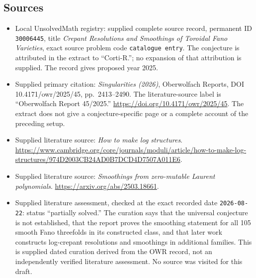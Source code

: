 \documentclass[11pt]{article}
\begin{document}
\subsection{Sources}
\begin{itemize}
\item Local UnsolvedMath registry: supplied complete source record, permanent ID \texttt{30006445}, title \emph{Crepant Resolutions and Smoothings of Toroidal Fano Varieties}, exact source problem code \texttt{catalogue entry}. The conjecture is attributed in the extract to ``Corti-R.''; no expansion of that attribution is supplied. The record gives proposed year 2025.
\item Supplied primary citation: \emph{Singularities (2026)}, Oberwolfach Reports, DOI 10.4171/owr/2025/45, pp.\ 2413--2490. The literature-source label is ``Oberwolfach Report 45/2025.'' \url{https://doi.org/10.4171/owr/2025/45}. The extract does not give a conjecture-specific page or a complete account of the preceding setup.
\item Supplied literature source: \emph{How to make log structures}. \url{https://www.cambridge.org/core/journals/moduli/article/how-to-make-log-structures/974D2003CB24AD0B7DCD4D7507A011E6}.
\item Supplied literature source: \emph{Smoothings from zero-mutable Laurent polynomials}. \url{https://arxiv.org/abs/2503.18661}.
\item Supplied literature assessment, checked at the exact recorded date \texttt{2026-08-22}: status ``partially solved.'' The curation says that the universal conjecture is not established, that the report proves the smoothing statement for all 105 smooth Fano threefolds in its constructed class, and that later work constructs log-crepant resolutions and smoothings in additional families. This is supplied dated curation derived from the OWR record, not an independently verified literature assessment. No source was visited for this draft.
\end{itemize}
\end{document}
